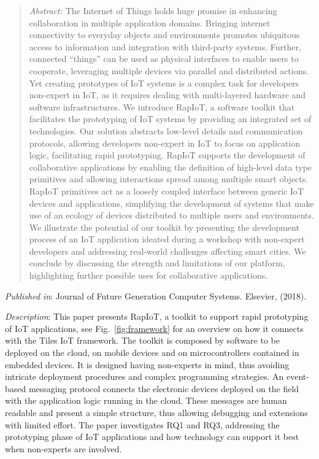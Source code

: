\begin{quote}
	\emph{Abstract:} The Internet of Things holds huge promise in enhancing collaboration in multiple application domains. Bringing internet connectivity to everyday objects and environments promotes ubiquitous access to information and integration with third-party systems. Further, connected \enquote{things} can be used as physical interfaces to enable users to cooperate, leveraging multiple devices via parallel and distributed actions. Yet creating prototypes of IoT systems is a complex task for developers non-expert in IoT, as it requires dealing with multi-layered hardware and software infrastructures. We introduce RapIoT, a software toolkit that facilitates the prototyping of IoT systems by providing an integrated set of technologies. Our solution abstracts low-level details and communication protocols, allowing developers non-expert in IoT to focus on application logic, facilitating rapid prototyping. RapIoT supports the development of collaborative applications by enabling the definition of high-level data type primitives and allowing interactions spread among multiple smart objects. RapIoT primitives act as a loosely coupled interface between generic IoT devices and applications, simplifying the development of systems that make use of an ecology of devices distributed to multiple users and environments. We illustrate the potential of our toolkit by presenting the development process of an IoT application ideated during a workshop with non-expert developers and addressing real-world challenges affecting smart cities. We conclude by discussing the strength and limitations of our platform, highlighting further possible uses for collaborative applications.
\end{quote}

\emph{Published in}: Journal of Future Generation Computer Systems. Elsevier, (2018).

\emph{Description}: This paper presents RapIoT, a toolkit to support rapid prototyping of IoT applications, see Fig.~\ref{fig:framework} for an overview on how it connects with the Tiles IoT framework. The toolkit is composed by software to be deployed on the cloud, on mobile devices and on microcontrollers contained in embedded devices. It is designed having non-experts in mind, thus avoiding intricate deployment procedures and complex programming strategies. An event-based messaging protocol connects the electronic devices deployed on the field with the application logic running in the cloud. These messages are human readable and present a simple structure, thus allowing debugging and extensions with limited effort.
The paper investigates RQ1 and RQ3, addressing the prototyping phase of IoT applications and how technology can support it best when non-experts are involved.


